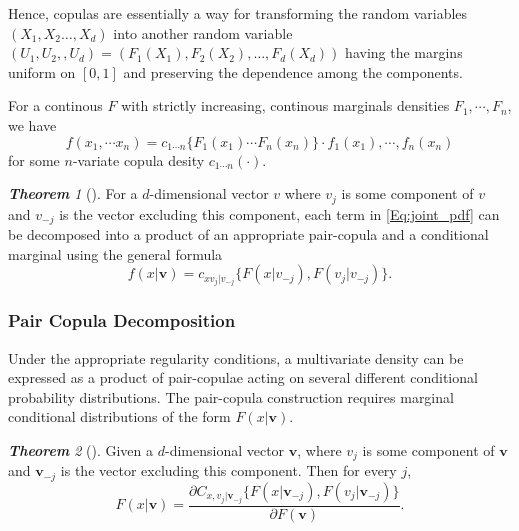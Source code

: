 \documentclass[12pt,oneside,a4paper]{book}
\theoremstyle{definition}
\theoremstyle{remark}
\newtheorem{thm}{\bf Theorem}[subsection]
\begin{document}
				Hence, copulas are essentially a way for transforming the random variables $(X_1,X_2 \dots,X_d)$ into another random variable $(U_1,U_2, ,U_d) = (F_1(X_1),F_2(X_2), \dots,F_d(X_d))$ having the margins uniform on $[0,1]$ and preserving the dependence among the components\cite{jaworski2010copula}.

				For a continous $F$ with strictly increasing, continous marginals densities $F_1, \cdots, F_n$, we have
				$$ f\left(x_1, \cdots x_n\right) = c_{1 \cdots n } \{ F_1\left( x_1\right) \cdots F_n\left( x_n \right) \} \cdot f_1\left(x_1\right), \cdots, f_n\left(x_n\right)$$ for some $n$-variate copula desity $c_{1\cdots n}\left(\cdotp\right).$

				\begin{thm} [\cite{aasPaircopulaConstructionsMultiple2009}] For a $d$-dimensional vector $v$ where $v_j$ is some component of $v$ and $v_{-j}$ is the vector excluding this component, each term in \ref{Eq:joint_pdf} can be decomposed into a product of an appropriate pair-copula and a conditional marginal using the general formula
					\begin{equation}
						f\left( x|\boldsymbol{v}\right) = c_{xv_j|v_{-j}} \{ F\left(x|v_{-j}\right), F\left(v_{j}|v_{-j}\right) \}.
					\end{equation}

				\end{thm}


				\subsubsection{Pair Copula Decomposition}
				Under the appropriate regularity conditions, a multivariate density can be expressed as a product of pair-copulae acting on several different conditional probability distributions.
				The pair-copula construction requires marginal conditional distributions of the form $F\left(x|\boldsymbol{v}\right)$.
				\begin{thm}[\cite{joeFamiliesMVariateDistributions1996}]
					Given a $d$-dimensional vector $\boldsymbol{v}$, where $v_j$ is some component of $\boldsymbol{v}$ and $\boldsymbol{v}_{-j}$ is the vector excluding this component. Then for every $j$, \begin{equation}
						F\left(x|\boldsymbol{v}\right) = \frac{\partial C_{x,v_{j} |\boldsymbol{v}_{-j}} \{ F\left( x|\boldsymbol{v}_{-j}\right), F\left(v_j| \boldsymbol{v}_{-j}\right) \}}{\partial F\left(\boldsymbol{v}\right)}.
					\end{equation}
				\end{thm}
\end{document}
